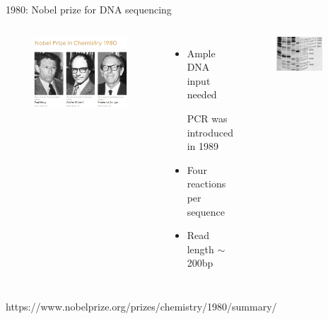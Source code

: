 \documentclass[10pt]{beamer}
\newcommand{\creditleft}[1]{{\vspace{\fill} \par \raggedright \scriptsize \mdseries \color{mDarkBrown} #1 \par}}
\begin{document}
\begin{frame}{1980: Nobel prize for DNA sequencing}
	\begin{columns}[T,onlytextwidth]
		\begin{figure}
			\includegraphics[width=\textwidth]{./figures/nobel-sanger.png}
		\end{figure}
		\begin{itemize}
			\item Ample DNA input needed\par {\scriptsize PCR was introduced in 1989}
			\item Four reactions per sequence
			\item Read length $\sim$ 200bp
		\end{itemize}
		\vspace{0.2cm}
		\begin{figure}
			\includegraphics[width=0.8\textwidth]{./figures/sangergel.png}
		\end{figure}
	\end{columns}
 \creditleft{https://www.nobelprize.org/prizes/chemistry/1980/summary/}
\end{frame}
\end{document}
